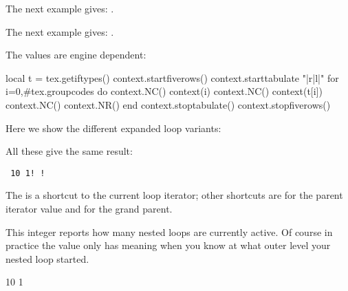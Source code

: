 The next example gives: \inlinebuffer.

\typebuffer

\stopoldprimitive

\startoldprimitive[title={\prm {currentiftype}}]

\startbuffer
[\the\currentiftype] \iftrue
    [\the\currentiftype]\iftrue
        [\the\currentiftype] \iftrue
            [\the\currentiftype]
        \fi [\the\currentiftype]
    \fi [\the\currentiftype]
\fi [\the\currentiftype]
\stopbuffer

The next example gives: \inlinebuffer.

\typebuffer

The values are engine dependent:

\startluacode
local t = tex.getiftypes()
context.startfiverows()
context.starttabulate { "|r|l|" }
for i=0,#tex.groupcodes do
    context.NC() context(i)
    context.NC() context(t[i])
    context.NC() context.NR()
end
context.stoptabulate()
context.stopfiverows()
\stopluacode

\stopoldprimitive

\startnewprimitive[title={\prm {currentloopiterator}}]

Here we show the different expanded loop variants:

\startbuffer
\edef\testA{\expandedloop  1 10 1{!}}
\edef\testB{\expandedrepeat  10  {!}}
\edef\testC{\expandedendless     {\ifnum\currentloopiterator>10 \quitloop\else !\fi}}
\edef\testD{\expandedendless     {\ifnum#I>10 \quitloop\else !\fi}}
\stopbuffer

\typebuffer \getbuffer

All these give the same result:

\startlines \tt
\meaningasis\testA
\meaningasis\testB
\meaningasis\testC
\meaningasis\testD
\stoplines

The  is a shortcut to the current loop iterator; other shortcuts are
 for the parent iterator value and  for the grand parent.

\stopnewprimitive

\startnewprimitive[title={\prm {currentloopnesting}}]

This integer reports how many nested loops are currently active. Of course in
practice the value only has meaning when you know at what outer level your nested
loop started.

\startbuffer
{} 10 1 {%
    \ifodd\currentloopiterator{}
    \fi
}
\stopbuffer

